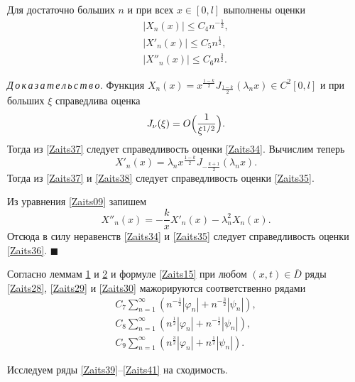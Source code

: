 \smallskip

\hypertarget{zay:l2}{}

\begin{lemma}[2]Для достаточно больших $n$ и при всех $x\in[0, l]$ выполнены оценки
\begin{gather}
\label{Zaits34}
|X_n(x)|\leq C_4n^{-\frac12},
\\
\label{Zaits35}
|X'_n(x)|\leq C_5n^{\frac12},
\\
\label{Zaits36}
|X''_n(x)|\leq C_6n^{\frac32}.
\end{gather}
\end{lemma}

\smallskip

\textit{Д\,о\,к\,а\,з\,а\,т\,е\,л\,ь\,с\,т\,в\,о.}
Функция $\displaystyle X_n(x)=x^{\frac{1-k}{2}}J_{\frac{1-k}{2}}\left(\lambda_nx\right)\in C^2[0,l]$ и при больших $\xi$ справедлива оценка
\begin{equation}
\label{Zaits37}
J_\nu(\xi)=O\Bigl(\frac{1}{\xi^{1/2}}\Bigr).
\end{equation}
Тогда из \eqref{Zaits37} следует справедливость оценки \eqref{Zaits34}. Вычислим теперь
\begin{equation}
\label{Zaits38}
X'_n(x)=\lambda_nx^{\frac{1-k}{2}}J_{-\frac{k+1}{2}}\left(\lambda_nx\right).
\end{equation}
Тогда из \eqref{Zaits37} и \eqref{Zaits38} следует справедливость оценки \eqref{Zaits35}.

Из уравнения \eqref{Zaits09} запишем
$$X''_n(x)=-\frac{k}{x}X'_n(x)-\lambda^2_nX_n(x).$$
Отсюда в силу неравенств \eqref{Zaits34} и \eqref{Zaits35} следует справедливость оценки \eqref{Zaits36}. $\blacksquare$

Согласно леммам \hyperlink{zay:l1}{1} и \hyperlink{zay:l2}{2} и формуле \eqref{Zaits15} при любом $(x,t)\in\overline{D}$ ряды \eqref{Zaits28}, \eqref{Zaits29} и \eqref{Zaits30} мажорируются соответственно рядами
\begin{gather}
\label{Zaits39}
C_7\sum\limits_{n=1}^\infty \left(n^{-\frac12}|\varphi_n|+n^{-\frac32}|\psi_n|\right),
\\
\label{Zaits41}
C_8\sum\limits_{n=1}^\infty \left(n^{\frac12}|\varphi_n|+n^{-\frac12}|\psi_n|\right),
\\
\label{Zaits41}
C_9\sum\limits_{n=1}^\infty \left(n^{\frac32}|\varphi_n|+n^{\frac12}|\psi_n|\right).
\end{gather}

Исследуем ряды \eqref{Zaits39}--\eqref{Zaits41} на сходимость.

